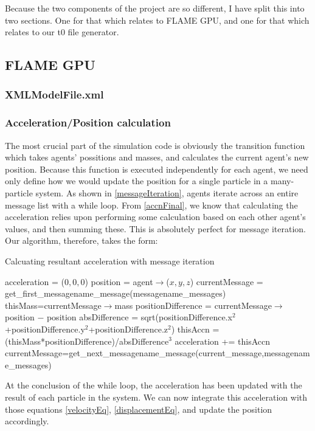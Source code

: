 \documentclass[11pt,a4paper]{article}
\begin{document}
Because the two components of the project are so different, I have split this into two sections. One for that which relates to FLAME GPU, and one for that which relates to our t0 file generator.
\subsection{FLAME GPU}

\subsubsection{XMLModelFile.xml}

\subsubsection{Acceleration/Position calculation}
The most crucial part of the simulation code is obviously the transition function which takes agents' possitions and masses, and calculates the current agent's new position. Because this function is executed independently for each agent, we need only define how we would update the position for a single particle in a many-particle system. As shown in \ref{messageIteration}, agents iterate across an entire message list with a while loop. From \ref{accnFinal}, we know that calculating the acceleration relies upon performing some calculation based on each other agent's values, and then summing these. This is absolutely perfect for message iteration. Our algorithm, therefore, takes the form:

\begin{algorithm}[H]
\caption{Calcuating resultant acceleration with message iteration}
\begin{algorithmic}
\STATE acceleration = ($0,0,0$)
\STATE position = agent$\to$($x,y,z$)
\STATE currentMessage = get\_first\_messagename\_message(messagename\_messages)
  \STATE thisMass=currentMessage$\to$mass
  \STATE positionDifference = currentMessage$\to$position $-$ position
  \STATE absDifference = sqrt(positionDifference.x$^2$+positionDifference.y$^2$+positionDifference.z$^2$)
  \STATE thisAccn = (thisMass*positionDifference)/absDifference$^3$
  \STATE acceleration += thisAccn
  \STATE currentMessage=get\_next\_messagename\_message(current\_message,messagename\_messages)
\ENDWHILE
\end{algorithmic}
\end{algorithm}

At the conclusion of the while loop, the acceleration has been updated with the result of each particle in the system. We can now integrate this acceleration with those equations \ref{velocityEq}, \ref{displacementEq}, and update the position accordingly.
\end{document}
